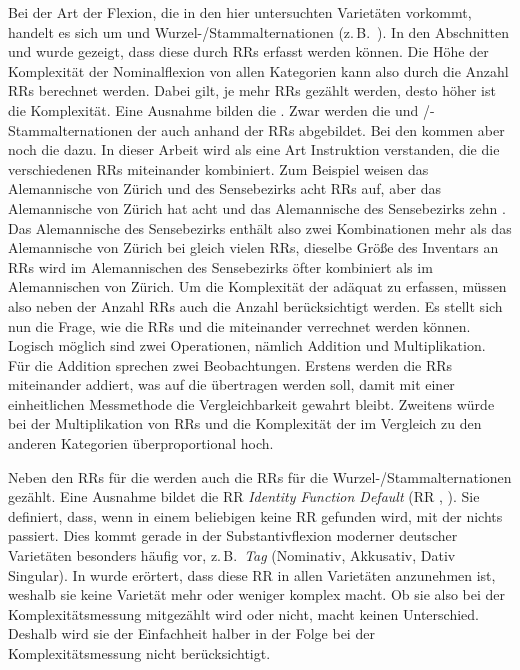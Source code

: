 \begin{exe}
\begin{exe}
Bei der Art der Flexion, die in den hier untersuchten Varietäten vorkommt, handelt es sich um  und Wur\-zel-/Stamm\-al\-ter\-na\-tio\-nen (z.\,B.\ ). In den Abschnitten  und  wurde gezeigt, dass diese durch RRs erfasst werden können. Die Höhe der Komplexität der Nominalflexion von allen Kategorien kann also durch die Anzahl RRs berechnet werden. Dabei gilt, je mehr RRs gezählt werden, desto höher ist die Komplexität. Eine Ausnahme bilden die . Zwar werden die  und /-Stammalternationen der  auch anhand der RRs abgebildet. Bei den  kommen aber noch die  dazu. In dieser Arbeit wird  als eine Art Instruktion verstanden, die die verschiedenen RRs miteinander kombiniert. Zum Beispiel weisen das Alemannische von Zürich und des Sensebezirks acht RRs auf, aber das Alemannische von Zürich hat acht  und das Alemannische des Sensebezirks zehn . Das Alemannische des Sensebezirks enthält also zwei Kombinationen mehr als das Alemannische von Zürich bei gleich vielen RRs, dieselbe Größe des Inventars an RRs wird im Alemannischen des Sensebezirks öfter kombiniert als im Alemannischen von Zürich. Um die Komplexität der  adäquat zu erfassen, müssen also neben der Anzahl RRs auch die Anzahl  berücksichtigt werden. Es stellt sich nun die Frage, wie die RRs und die  miteinander verrechnet werden können. Logisch möglich sind zwei Operationen, nämlich Addition und Multiplikation. Für die Addition sprechen zwei Beobachtungen. Erstens werden die RRs miteinander addiert, was auf die  übertragen werden soll, damit mit einer einheitlichen Messmethode die Vergleichbarkeit gewahrt bleibt. Zweitens würde bei der Multiplikation von RRs und  die Komplexität der  im Vergleich zu den anderen Kategorien überproportional hoch.

Neben den RRs für die  werden auch die RRs für die Wur\-zel-/Stamm\-al\-ter\-na\-tio\-nen gezählt. Eine Ausnahme bildet die RR \textit{Identity Function Default} (RR , ). Sie definiert, dass, wenn in einem beliebigen  keine RR gefunden wird, mit der  nichts passiert. Dies kommt gerade in der Substantivflexion moderner deutscher Varietäten besonders häufig vor, z.\,B.\ \textit{Tag} (Nominativ, Akkusativ, Dativ Singular). In  wurde erörtert, dass diese RR in allen Varietäten anzunehmen ist, weshalb sie keine Varietät mehr oder weniger komplex macht. Ob sie also bei der Komplexitätsmessung mitgezählt wird oder nicht, macht keinen Unterschied. Deshalb wird sie der Einfachheit halber in der Folge bei der Komplexitätsmessung nicht berücksichtigt.


\end{exe}
\end{exe}
